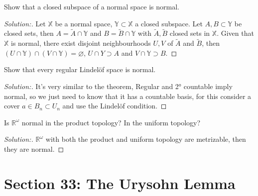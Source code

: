 \documentclass[a4paper,12pt, reqno]{article}
\theoremstyle{definition}
\newenvironment{exerr}[1]{
  \renewcommand\theexeralt{#1}
  \exeralt
}{\endexeralt}
\newenvironment{solution}{\begin{proof}[Solution:]}{\end{proof}}
\newcommand{\R}{\mathbb{R}}
\newcommand{\X}{\mathbb{X}}
\newcommand{\Y}{\mathbb{Y}}
\begin{document}
\begin{exerr}{1}
  Show that a closed subspace of a normal space is normal.
\end{exerr}
\begin{solution}
  Let $\X$ be a normal space, $\Y\subset\X$ a closed subspace. Let $A,B\subset\Y$ be closed sets, then $A = \widetilde{A}\cap\Y$ and $B = \widetilde{B}\cap\Y$ with $\widetilde{A},\widetilde{B}$ closed sets in $\X$. Given that $\X$ is normal, there exist disjoint neighbourhoods $U, V$ of $\widetilde{A}$ and $\widetilde{B}$, then $(U\cap\Y)\cap(V\cap\Y) = \varnothing$, $U\cap Y\supset A$ and $V\cap\Y\supset B$.
\end{solution}

\begin{exerr}{4}
  Show that every regular Lindelöf space is normal.
\end{exerr}
\begin{solution}
  It's very similar to the theorem, Regular and 2° countable imply normal, so we just need to know that it has a countable basis, for this consider a cover $a\in B_{n}\subset U_{n}$ and use the Lindelöf condition.
\end{solution}

\begin{exerr}{5}
  Is $\R^\omega$ normal in the product topology? In the uniform topology?
\end{exerr}
\begin{solution}
  $\R^\omega$ with both the product and uniform topology are metrizable, then they are normal.
\end{solution}


\section*{Section 33: The Urysohn Lemma}
\end{document}
